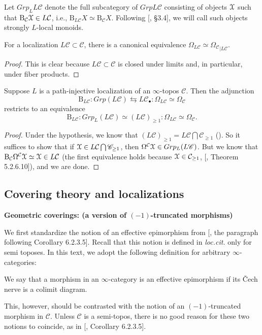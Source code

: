 Let $ Grp_{L}L\mathcal{C}$ denote the full subcategory of $ GrpL\mathcal{C}$ consisting of objects $\EuScript{X}$ such that $\mathrm{B}_\mathcal{C}\EuScript{X}\in L\mathcal{C}$, i.e., $\mathrm{B}_{L\mathcal{C}}X\simeq \mathrm{B}_{\mathcal{C}}X$. Following [\cite{elmanto2021motivic}, \S3.4], we will call such objects strongly $L$-local monoids.
\begin{lem}
    For a localization $L\mathcal{C}\subset \mathcal{C}$, there is a canonical equivalence $\Omega_{L\mathcal{C}}\simeq {\Omega_\mathcal{C}}_{|L\mathcal{C}}$.
\end{lem} 
\begin{proof}
    This is clear because $L\mathcal{C}\subset \mathcal{C}$ is closed under limits and, in particular, under fiber products.
\end{proof}
\begin{thm}\label{loop bar for localization}
   Suppose $L$ is a path-injective localization of an $\infty$-topos $\mathcal{C}$. Then the adjunction $$ \mathrm{B}_{L\mathcal{C}} : Grp(L\mathscr{C})\leftrightarrows L\mathcal{C}_\bullet: \Omega_{L\mathcal{C}}\simeq \Omega_\mathcal{C}$$ restricts to an equivalence $$\mathrm{B}_{L\mathcal{C}} : Grp_L(L\mathscr{C})\simeq (L\mathcal{C})_{\geq 1}: \Omega_{L\mathcal{C}}\simeq \Omega_\mathcal{C}.$$ 
 \end{thm}
\begin{proof}
     Under the hypothesis, we know that $(L\mathscr{C})_{\geq 1}= L\mathcal{C}\bigcap \mathscr{C}_{\geq 1}$ (). So it suffices to show that if $\EuScript{X}\in L\mathcal{C}\bigcap \mathscr{C}_{\geq 1}$, then $\Omega^{\mathcal{C}}\EuScript{X}  \in  Grp_L(L\mathscr{C})$. But we know that $\mathrm{B}_\mathcal{C}\Omega^\mathcal{C}\EuScript{X}\simeq \EuScript{X}\in L\mathcal{C}$ (the first equivalence holds because $\EuScript{X}\in \mathcal{C}_{\geq 1}$, [\cite{lurie2017higher}, Theorem 5.2.6.10]), and we are done.
\end{proof}

 
\subsection{Covering theory and localizations}
\textbf{Geometric coverings: (a version of $(-1)$-truncated morphisms)}

We first standardize the notion of an effective epimorphism from [\cite{lurie2009higher}, the paragraph following Corollary 6.2.3.5]. Recall that this notion is defined in \textit{loc.cit.} only for semi toposes. In this text, we adopt the following definition for arbitrary $\infty$-categories:
\begin{defn}
We say that a morphism in an $\infty$-category is an effective epimorphism if its \v Cech nerve is a colimit diagram.    
\end{defn}
\begin{rem}
    This, however, should be contrasted with the notion of an $(-1)$-truncated morphism in $\mathcal{C}$. Unless $\mathcal{C}$ is a semi-topos, there is no good reason for these two notions to coincide, as in 
    [\cite{lurie2009higher}, Corollary 6.2.3.5].
\end{rem}


